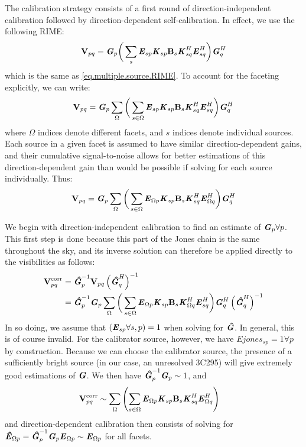 \pg
The calibration strategy consists of a first round of direction-independent calibration followed by direction-dependent self-calibration. In effect, we use the following RIME:
\begin{equation}
\textbf{V}_{pq} = \textbf{\emph{G}}_p \bigg( \sum_s \textbf{\emph{E}}_{sp} \textbf{\emph{K}}_{sp} \textbf{B}_{s} \textbf{\emph{K}}_{sq}^H \textbf{\emph{E}}_{sq}^H \bigg) \textbf{\emph{G}}_q^H
\end{equation}
which is the same as \cref{eq.multiple.source.RIME}. To account for the faceting explicitly, we can write:
\begin{equation}
\textbf{V}_{pq} = \textbf{\emph{G}}_p \sum_{\Omega}\bigg( \sum_{s\in\Omega} \textbf{\emph{E}}_{sp} \textbf{\emph{K}}_{sp} \textbf{B}_{s} \textbf{\emph{K}}_{sq}^H \textbf{\emph{E}}_{sq}^H \bigg) \textbf{\emph{G}}_q^H
\end{equation}
where $\Omega$ indices denote different facets, and $s$ indices denote individual sources. Each source in a given facet is assumed to have similar direction-dependent gains, and their cumulative signal-to-noise allows for better estimations of this direction-dependent gain than would be possible if solving for each source individually. Thus:
\begin{equation}
\textbf{V}_{pq} = \textbf{\emph{G}}_p \sum_{\Omega}\bigg( \sum_{s\in\Omega} \textbf{\emph{E}}_{\Omega p} \textbf{\emph{K}}_{sp} \textbf{B}_{s} \textbf{\emph{K}}_{sq}^H \textbf{\emph{E}}_{\Omega q}^H \bigg) \textbf{\emph{G}}_q^H
\end{equation}

\pg
We begin with direction-independent calibration to find an estimate of $\textbf{\emph{G}}_p\forall p$. This first step is done because this part of the Jones chain is the same throughout the sky, and its inverse solution can therefore be applied directly to the visibilities as follows:
\begin{align}
\textbf{V}_{pq}^\mathrm{corr} &= \textbf{\emph{\^{G}}}_p^{-1} \textbf{V}_{pq} \left( \textbf{\emph{\^{G}}}_q^H \right)^{-1}\\
						&= \textbf{\emph{\^{G}}}_p^{-1}\textbf{\emph{G}}_p \sum_{\Omega}\bigg( \sum_{s\in\Omega} \textbf{\emph{E}}_{\Omega p} \textbf{\emph{K}}_{sp} \textbf{B}_{s} \textbf{\emph{K}}_{\Omega q}^H \textbf{\emph{E}}_{sq}^H \bigg) \textbf{\emph{G}}_q^H \left( \textbf{\emph{\^{G}}}_q^H \right)^{-1}
\end{align}
In so doing, we assume that $\left(\textbf{\emph{E}}_{sp}\forall s,p\right) =1$ when solving for $\textbf{\emph{\^{G}}}$. In general, this is of course invalid. For the calibrator source, however, we have $Ejones_{sp} =1 \forall p$ by construction. Because we can choose the calibrator source, the presence of a sufficiently bright source (in our case, an unresolved 3C295) will give extremely good estimations of $\textbf{\emph{G}}$. We then have $\textbf{\emph{\^{G}}}_p^{-1}\textbf{\emph{G}}_p\sim 1$, and
\begin{align}
\textbf{V}_{pq}^\mathrm{corr} &\sim \sum_{\Omega}\left( \sum_{s\in\Omega} \textbf{\emph{E}}_{\Omega p} \textbf{\emph{K}}_{sp} \textbf{B}_{s} \textbf{\emph{K}}_{sq}^H \textbf{\emph{E}}_{\Omega q}^H \right)
\end{align}
and direction-dependent calibration then consists of solving for $\textbf{\emph{\^{E}}}_{\Omega p} = \textbf{\emph{\^{G}}}_p^{-1}\textbf{\emph{G}}_p\textbf{\emph{E}}_{\Omega p} \sim \textbf{\emph{E}}_{\Omega p}$ for all facets.

